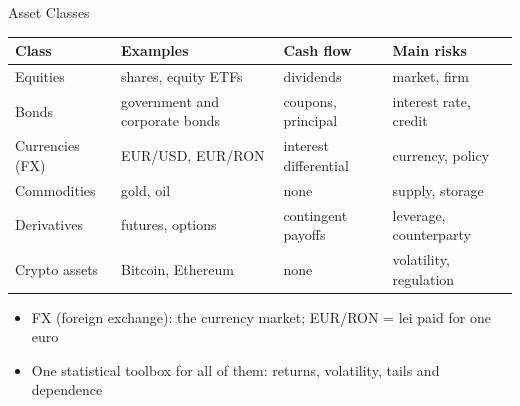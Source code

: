 \begin{frame}{Asset Classes}
\itemsize{\footnotesize}
\begin{center}
\footnotesize
\begin{tabular}{>{\raggedright\arraybackslash}p{2.2cm}>{\raggedright\arraybackslash}p{4.0cm}>{\raggedright\arraybackslash}p{2.8cm}>{\raggedright\arraybackslash}p{3.2cm}}
\toprule
\textbf{Class} & \textbf{Examples} & \textbf{Cash flow} & \textbf{Main risks} \\
\midrule
Equities & shares, equity ETFs & dividends & market, firm \\
Bonds & government and corporate bonds & coupons, principal & interest rate, credit \\
Currencies (FX) & EUR/USD, EUR/RON & interest differential & currency, policy \\
Commodities & gold, oil & none & supply, storage \\
Derivatives & futures, options & contingent payoffs & leverage, counterparty \\
Crypto assets & Bitcoin, Ethereum & none & volatility, regulation \\
\bottomrule
\end{tabular}
\end{center}
\begin{itemize}
    \item FX (foreign exchange): the currency market; EUR/RON = lei paid for one euro
    \item One statistical toolbox for all of them: returns, volatility, tails and dependence
\end{itemize}
\end{frame}

